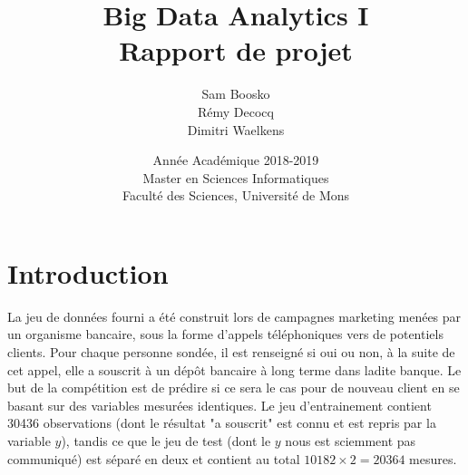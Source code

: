\documentclass[]{article}
\begin{document}
\title{
\vspace{1.6cm}
{\Huge Big Data Analytics I}\\
\vspace{0.5cm}
{\Huge Rapport de projet}\\
}
\bigskip


\author{
\Large{Sam Boosko}\\
\Large{Rémy Decocq}\\
\Large{Dimitri Waelkens}
}

\date{
\vspace{9.5cm}
Année Académique 2018-2019\\
Master en Sciences Informatiques\\
Faculté des Sciences, Université de Mons}

\maketitle          

\thispagestyle{empty}   

\newpage

\section{Introduction}

La jeu de données fourni a été construit lors de campagnes marketing menées par un organisme bancaire, sous la forme d'appels téléphoniques vers de potentiels clients. Pour chaque personne sondée, il est renseigné si oui ou non, à la suite de cet appel, elle a souscrit à un dépôt bancaire à long terme dans ladite banque. Le but de la compétition est de prédire si ce sera le cas pour de nouveau client en se basant sur des variables mesurées identiques. Le jeu d'entrainement contient 30436 observations (dont le résultat "a souscrit" est connu et est repris par la variable $y$), tandis ce que le jeu de test (dont le $y$ nous est sciemment pas communiqué) est séparé en deux et contient au total $10182 \times 2 = 20364$ mesures.
\end{document}
